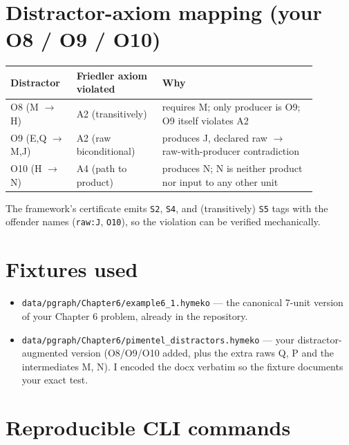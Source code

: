\documentclass[11pt]{article}
\begin{document}
\section*{Distractor-axiom mapping (your O8 / O9 / O10)}

\begin{table}[h]
\centering
\small
\begin{tabular}{p{0.18\linewidth}p{0.25\linewidth}p{0.45\linewidth}}
\toprule
Distractor & Friedler axiom violated & Why \\
\midrule
O8 (M $\to$ H) & A2 (transitively) & requires M; only producer is O9; O9 itself violates A2 \\
O9 (E,Q $\to$ M,J) & A2 (raw biconditional) & produces J, declared raw $\to$ raw-with-producer contradiction \\
O10 (H $\to$ N) & A4 (path to product) & produces N; N is neither product nor input to any other unit \\
\bottomrule
\end{tabular}
\end{table}

The framework's certificate emits \texttt{S2}, \texttt{S4}, and (transitively) \texttt{S5}
tags with the offender names (\texttt{raw:J}, \texttt{O10}), so the violation can be
verified mechanically.

\section*{Fixtures used}

\begin{itemize}[leftmargin=2em,itemsep=0pt]
  \item \texttt{data/pgraph/Chapter6/example6\_1.hymeko} --- the canonical 7-unit
        version of your Chapter 6 problem, already in the repository.
  \item \texttt{data/pgraph/Chapter6/pimentel\_distractors.hymeko} --- your
        distractor-augmented version (O8/O9/O10 added, plus the extra raws
        Q, P and the intermediates M, N). I encoded the docx verbatim so the
        fixture documents your exact test.
\end{itemize}

\section*{Reproducible CLI commands}
\end{document}
